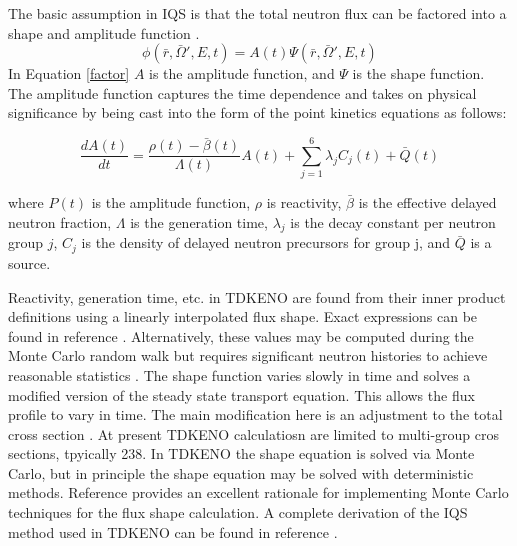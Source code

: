 \documentclass[11pt]{article}
\begin{document}
The basic assumption in IQS is that the total neutron flux can be factored into a shape and amplitude function \cite{Gehin}.  
\begin{equation}
\label{factor}
    \phi(\bar{r},\bar{\Omega}',E,t) = A(t)\Psi(\bar{r},\bar{\Omega}',E,t)
\end{equation}
In Equation \ref{factor} $A$ is the amplitude function, and $\Psi$ is the shape function.
The amplitude function captures the time dependence and takes on physical significance by being cast into the form of the point kinetics equations as follows:

\begin{equation}
    \label{eq:pt_kin}
    \frac{dA(t)}{dt} = \frac{\rho(t)-\bar{\beta}(t)}{\Lambda(t)} A(t) + \sum_{j=1}^{6} \lambda_jC_j(t) + \bar{Q}(t)
\end{equation}

where $P(t)$ is the amplitude function, $\rho$ is reactivity, $\bar{\beta}$ is the effective delayed neutron fraction, $\Lambda$ is the generation time, $\lambda_j$ is the decay constant per neutron group $j$, $C_j$ is the density of delayed neutron precursors for group j, and $\bar{Q}$ is a source.

 Reactivity, generation time, etc. in TDKENO are found from their inner product definitions using a linearly interpolated flux shape. Exact expressions can be found in reference \cite{Bentley}.  Alternatively, these values may be computed during the Monte Carlo random walk but requires significant neutron histories to achieve reasonable statistics \cite{Waddell}.  The shape function varies slowly in time and solves a modified version of the steady state transport equation.  This allows the flux profile to vary in time.  The main modification here is an adjustment to the total cross section \cite{goluoglu2001time}\cite{Gehin}.  At present TDKENO calculatiosn are limited to multi-group cros sections, tpyically 238.  In TDKENO the shape equation is solved via Monte Carlo, but in principle the shape equation may be solved with deterministic methods.  Reference \cite{Shayesteh} provides an excellent rationale for implementing Monte Carlo techniques for the flux shape calculation.  A complete derivation of the IQS method used in TDKENO can be found in reference \cite{Bentley}. 
 
\end{document}
